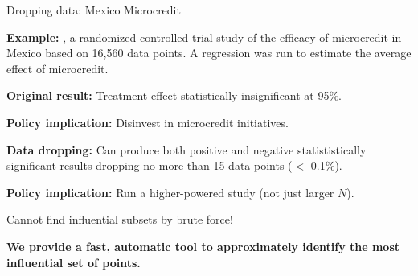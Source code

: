 \begin{frame}[t]{Dropping data: Mexico Microcredit}


\vspace{1em} \textbf{Example:} \citet{angelucci2015microcredit}, a randomized
controlled trial study of the efficacy of microcredit in Mexico based on 16,560
data points. A regression was run to estimate the average effect of microcredit.

\hrulefill

\vspace{1em}
\textbf{Original result: }
Treatment effect statistically insignificant at 95\%.


\vspace{1em}
\textbf{Policy implication: } Disinvest in microcredit initiatives.

\hrulefill

\vspace{1em} \textbf{Data dropping: } Can produce both positive and negative
statististically significant results dropping no more than 15 data points
($<$ 0.1\%).

\vspace{1em}
\textbf{Policy implication: } Run a higher-powered study (not just
larger $N$).

\hrulefill

Cannot find influential subsets by brute force!

\vspace{1em}
\textbf{We provide a fast, automatic tool to  approximately identify the
most influential set of points.}


\end{frame}


